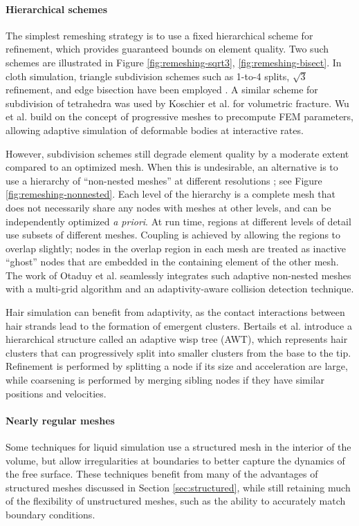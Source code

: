 \paragraph*{Hierarchical schemes} The simplest remeshing strategy is to use a fixed hierarchical scheme for refinement, which provides guaranteed bounds on element quality.
Two such schemes are illustrated in Figure \ref{fig:remeshing-sqrt3}, \ref{fig:remeshing-bisect}.
In cloth simulation, triangle subdivision schemes such as 1-to-4 splits, $\sqrt3$ refinement, and edge bisection have been employed \cite{Li2005,Simnett2009,Bender2012:adaptiveFEM}.
A similar scheme for subdivision of tetrahedra was used by Koschier et al. \cite{Koschier2014} for volumetric fracture.
Wu et al. \cite{Wu2001} build on the concept of progressive meshes \cite{Hoppe1996} to precompute FEM parameters, allowing adaptive simulation of deformable bodies at interactive rates.

However, subdivision schemes still degrade element quality by a moderate extent compared to an optimized mesh.
When this is undesirable, an alternative is to use a hierarchy of ``non-nested meshes'' at different resolutions \cite{Debunne2000,Debunne2001}; see Figure \ref{fig:remeshing-nonnested}.
Each level of the hierarchy is a complete mesh that does not necessarily share any nodes with meshes at other levels, and can be independently optimized \textit{a priori}.
At run time, regions at different levels of detail use subsets of different meshes.
Coupling is achieved by allowing the regions to overlap slightly; nodes in the overlap region in each mesh are treated as inactive ``ghost'' nodes that are embedded in the containing element of the other mesh.
The work of Otaduy et al. \cite{Otaduy2007} seamlessly integrates such adaptive non-nested meshes with a multi-grid algorithm and an adaptivity-aware collision detection technique.

Hair simulation can benefit from adaptivity, as the contact interactions between hair strands lead to the formation of emergent clusters.
Bertails et al. \cite{Bertails2003} introduce a hierarchical structure called an adaptive wisp tree (AWT), which represents hair clusters that can progressively split into smaller clusters from the base to the tip.
Refinement is performed by splitting a node if its size and acceleration are large, while coarsening is performed by merging sibling nodes if they have similar positions and velocities.

\paragraph*{Nearly regular meshes}
Some techniques for liquid simulation use a structured mesh in the interior of the volume, but allow irregularities at boundaries to better capture the dynamics of the free surface.
These techniques benefit from many of the advantages of structured meshes discussed in Section \ref{sec:structured}, while still retaining much of the flexibility of unstructured meshes, such as the ability to accurately match boundary conditions.

